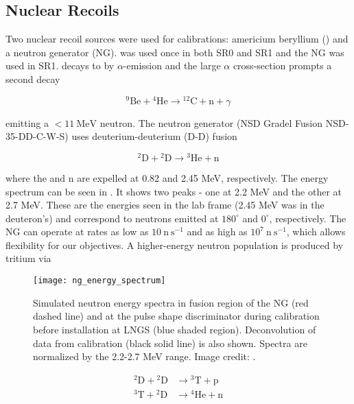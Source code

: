 \subsection{Nuclear Recoils}
\label{subsec:er_nr_calibrations_parameter_determ_nr}
Two nuclear recoil sources were used for calibrations: americium beryllium () and a neutron generator
(NG).  \ambe was used once in both SR0 and SR1 and the NG was used in SR1.  \ambe decays to  by $\alpha$-emission and
the large  $\alpha$ cross-section prompts a second decay

\begin{equation}
\mathrm{^{9}Be} + \mathrm{^{4}He} \rightarrow \mathrm{^{12}C + n} + \gamma
\end{equation}

\noindent emitting a $< 11\ \mathrm{MeV}$ neutron.  The neutron generator (NSD Gradel Fusion NSD-35-DD-C-W-S) uses
deuterium-deuterium (D-D) fusion

\begin{equation}
\mathrm{^{2}D} + \mathrm{^{2}D} \rightarrow \mathrm{^{3}He} + \mathrm{n}
\end{equation}

\noindent where the  and n are expelled at 0.82 and 2.45 MeV, respectively.  The energy spectrum can be seen in
.  It shows two peaks - one at 2.2 MeV and the other at 2.7 MeV.  These
are the energies seen in the lab frame (2.45 MeV was in the deuteron's) and correspond to neutrons emitted at $180^{\circ}$ and
$0^{\circ}$, respectively.  The NG can operate at rates as low as $10\ \mathrm{n\ s^{-1}}$
and as high as $10^7\ \mathrm{n\ s^{-1}}$, which allows flexibility for our objectives.  A higher-energy neutron
population is produced by tritium via

\begin{figure}
\centering
\texttt{[image: ng\_energy\_spectrum]}
\caption{Simulated neutron energy spectra in fusion region of the NG (red dashed line) and at the pulse shape discriminator during
calibration before installation at LNGS (blue shaded region).  Deconvolution of data from calibration (black solid line) is also
shown.  Spectra are normalized by the 2.2-2.7 MeV range.  Image credit: .}
\label{fig:er_nr_calibrations_parameter_determ_nr_ng_energy}
\end{figure}

\begin{subequations}
\begin{align}
\mathrm{^{2}D} + \mathrm{^{2}D} &\rightarrow \mathrm{^{3}T} + \mathrm{p} \\
\mathrm{^{3}T} + \mathrm{^{2}D} &\rightarrow \mathrm{^{4}He} + \mathrm{n}
\end{align}
\end{subequations}

